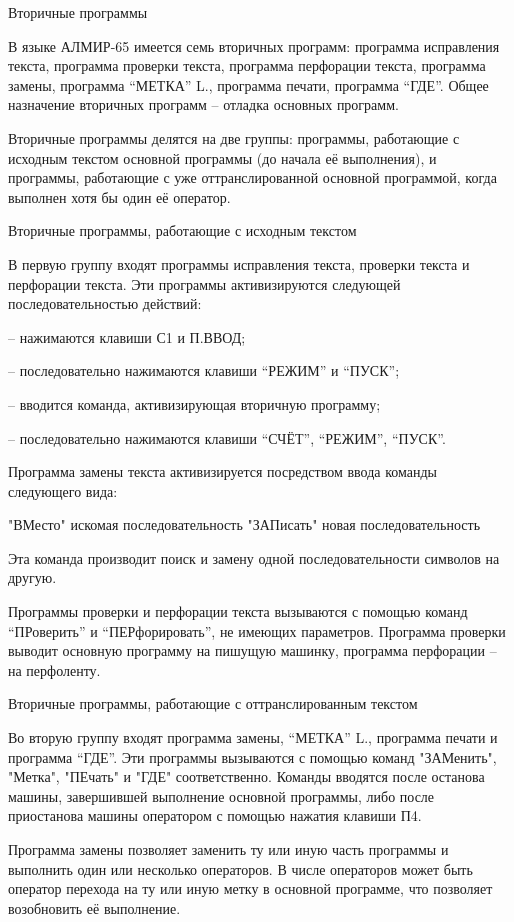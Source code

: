 \documentclass[11pt]{article}
\begin{document}
Вторичные программы

В языке АЛМИР-65 имеется семь вторичных
программ: программа исправления
текста, программа проверки текста,
программа перфорации текста, программа
замены, программа “МЕТКА” L., программа
печати, программа “ГДЕ”. Общее
назначение вторичных программ –
отладка основных программ.

Вторичные программы делятся на две
группы: программы, работающие с
исходным текстом основной программы
(до начала её выполнения), и программы,
работающие с уже оттранслированной
основной программой, когда выполнен
хотя бы один её оператор.

Вторичные программы, работающие с
исходным текстом

В первую группу входят программы
исправления текста, проверки текста и
перфорации текста. Эти программы
активизируются следующей
последовательностью действий:

– нажимаются клавиши С1 и П.ВВОД;

– последовательно нажимаются клавиши
“РЕЖИМ” и “ПУСК”;

– вводится команда, активизирующая
вторичную программу;

– последовательно нажимаются клавиши
“СЧЁТ”, “РЕЖИМ”, “ПУСК”.

Программа замены текста
активизируется посредством ввода
команды следующего вида:

"ВМесто" искомая последовательность
"ЗАПисать" новая последовательность

Эта команда производит поиск и замену
одной последовательности символов на
другую.

Программы проверки и перфорации текста
вызываются с помощью команд
“ПРоверить” и “ПЕРфорировать”, не
имеющих параметров. Программа проверки
выводит основную программу на пишущую
машинку, программа перфорации – на
перфоленту.

Вторичные программы, работающие с
оттранслированным текстом

Во вторую группу входят программа
замены, “МЕТКА” L., программа печати и
программа “ГДЕ”. Эти программы
вызываются с помощью команд "ЗАМенить",
"Метка", "ПЕчать" и "ГДЕ" соответственно.
Команды вводятся после останова
машины, завершившей выполнение
основной программы, либо после
приостанова машины оператором с
помощью нажатия клавиши П4.

Программа замены позволяет заменить ту
или иную часть программы и выполнить
один или несколько операторов. В числе
операторов может быть оператор
перехода на ту или иную метку в
основной программе, что позволяет
возобновить её выполнение.
\end{document}

